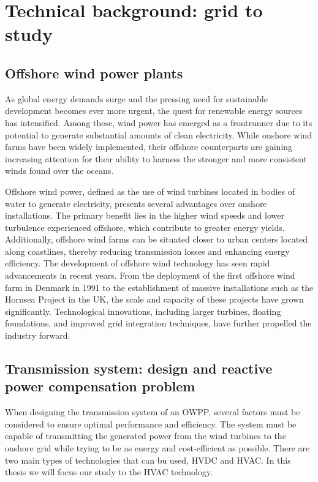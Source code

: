 \documentclass[a4paper,11pt, titlepage, twoside]{article}
\begin{document}
\section{Technical background: grid to study}\label{Grid}

\subsection{Offshore wind power plants}
As global energy demands surge and the pressing need for sustainable development becomes ever more urgent, 
the quest for renewable energy sources has intensified. Among these, wind power has emerged as a frontrunner due to its potential to generate substantial amounts of clean electricity.
While onshore wind farms have been widely implemented, their offshore counterparts are gaining increasing attention for their ability to harness the stronger and more consistent winds found over the oceans.\par

Offshore wind power, defined as the use of wind turbines located in bodies of water to generate electricity, presents several advantages over onshore installations. The primary benefit lies in the higher wind speeds
and lower turbulence experienced offshore, which contribute to greater energy yields. Additionally, offshore wind farms can be situated closer to urban centers located along coastlines, thereby reducing transmission
losses and enhancing energy efficiency. The development of offshore wind technology has seen rapid advancements in recent years. From the deployment of the first offshore wind farm in Denmark in 1991 to the establishment
of massive installations such as the Hornsea Project in the UK, the scale and capacity of these projects have grown significantly. Technological innovations, including larger turbines, floating foundations, and improved
grid integration techniques, have further propelled the industry forward.

\subsection{Transmission system: design and reactive power compensation problem}\label{reactpowpresetation}

When designing the transmission system of an OWPP, several factors must be considered to ensure optimal performance and efficiency. The system must be capable of transmitting the generated power from the wind turbines to the onshore grid
while trying to be as energy and cost-efficient as possible. There are two main types of technologies that can bu used, HVDC and HVAC. In this thesis we will focus our study to the HVAC technology.\par
\end{document}
